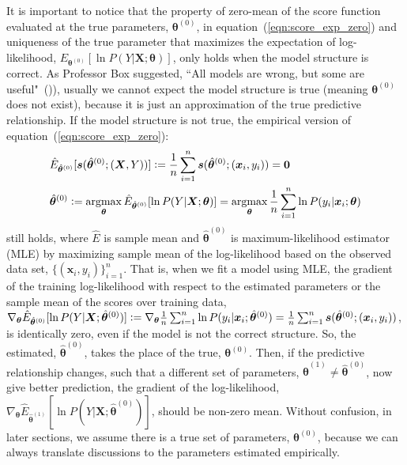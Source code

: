 \documentclass[twoside,11pt]{article}
\DeclareMathOperator*{\argmax}{argmax} %
\begin{document}
It is important to notice that the property of zero-mean of the score function evaluated at the true parameters, $\bm{\theta}^{(0)}$, in equation~(\ref{eqn:score_exp_zero}) and uniqueness of the true parameter that maximizes the expectation of log-likelihood, $E_{\bm{\theta}^{(0)}}[\ln{P(Y|\bm{X};\bm{\theta})}]$, only holds when the model structure is correct. As Professor Box suggested, ``All models are wrong, but some are useful"~(\cite{box1976science})), usually we cannot expect the model structure is true (meaning $\bm{\theta}^{(0)}$ does not exist), because it is just an approximation of the true predictive relationship. If the model structure is not true, the empirical version of equation~(\ref{eqn:score_exp_zero}):
\begin{align}
\begin{aligned}
&\hat{E}_{\hat{\bm{\theta}}^{(0)}}[\bm{s}(\hat{\bm{\theta}}^{(0)};(\bm{X}, Y))] \vcentcolon=\frac{1}{n}\sum_{i=1}^{n}\bm{s}(\hat{\bm{\theta}}^{(0)};(\bm{x}_i, y_i))=\bm{0}\\
&\hat{\bm{\theta}}^{(0)} \vcentcolon= \argmax_{\bm{\theta}}\hat{E}_{\hat{\bm{\theta}}^{(0)}}[\ln{P(Y|\bm{X}; \bm{\theta})}]=\argmax_{\bm{\theta}}\frac{1}{n}\sum_{i=1}^n \ln{P(y_i|\bm{x}_i;\bm{\theta})}
\end{aligned}
\label{eqn:score_exp_zero_emp}
\end{align}   
still holds, where $\hat{E}$ is sample mean and $\hat{\bm{\theta}}^{(0)}$ is maximum-likelihood estimator (MLE) by maximizing sample mean of the log-likelihood based on the observed data set, $\{(\bm{x}_i, y_i)\}_{i=1}^n$. That is, when we fit a model using MLE, the gradient of the training log-likelihood with respect to the estimated parameters or the sample mean of the scores over training data, $\nabla_{\bm{\theta}}\hat{E}_{\hat{\bm{\theta}}^{(0)}}[\ln{P(Y|\bm{X}; \hat{\bm{\theta}}^{(0)})}]\vcentcolon=\nabla_{\bm{\theta}}\frac{1}{n}\sum_{i=1}^n \ln{P(y_i|\bm{x}_i;\hat{\bm{\theta}}^{(0)})}=\frac{1}{n}\sum_{i=1}^n\bm{s}(\hat{\bm{\theta}}^{(0)};(\bm{x}_i, y_i))$, is identically zero, even if the model is not the correct structure. So, the estimated, $\hat{\bm{\theta}}^{(0)}$, takes the place of the true, $\bm{\theta}^{(0)}$. Then, if the predictive relationship changes, such that a different set of parameters, $\hat{\bm{\theta}}^{(1)}\neq \hat{\bm{\theta}}^{(0)}$, now give better prediction, the gradient of the log-likelihood, $\nabla_{\bm{\theta}}\hat{E}_{\hat{\bm{\theta}}^{(1)}}[\ln{P(Y|\bm{X}; \hat{\bm{\theta}}^{(0)})}]$, should be non-zero mean. Without confusion, in later sections, we assume there is a true set of parameters, $\bm{\theta}^{(0)}$, because we can always translate discussions to the parameters estimated empirically.
\end{document}
